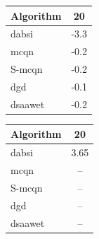 \begin{tabular}{lc}
\hline
Algorithm & 20 \\
\hline
\gls{dabsi} & -3.3 \\
\gls{mcqn} & -0.2 \\
S-\gls{mcqn} & -0.2 \\
\gls{dgd} & -0.1 \\
\gls{dsaawet} & -0.2 \\
\hline
\end{tabular}

\begin{tabular}{lc}
\hline
Algorithm & 20 \\
\hline
\gls{dabsi} & 3.65 \\
\gls{mcqn} & -- \\
S-\gls{mcqn} & -- \\
\gls{dgd} & -- \\
\gls{dsaawet} & -- \\
\hline
\end{tabular}

